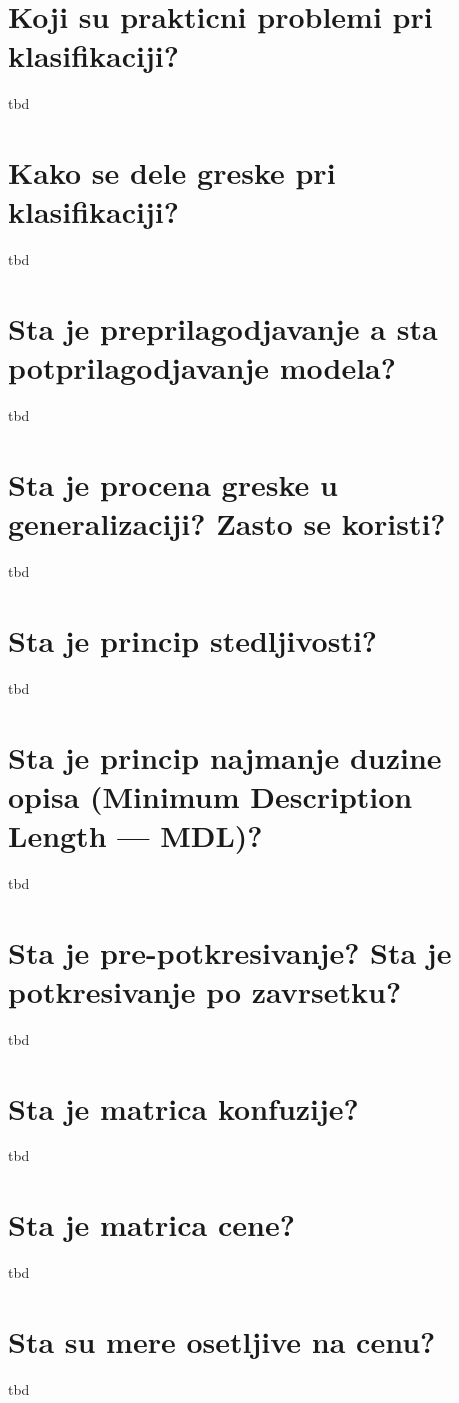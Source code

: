 \documentclass[a4paper]{article}
\begin{document}
\section{Koji su prakticni problemi pri klasifikaciji?}
tbd
\section{Kako se dele greske pri klasifikaciji?}
tbd
\section{Sta je preprilagodjavanje a sta potprilagodjavanje modela?}
tbd
\section{Sta je procena greske u generalizaciji? Zasto se koristi?}
tbd
\section{Sta je princip stedljivosti?}
tbd
\section{Sta je princip najmanje duzine opisa (Minimum Description Length --- MDL)?}
tbd
\section{Sta je pre-potkresivanje? Sta je potkresivanje po zavrsetku?}
tbd
\section{Sta je matrica konfuzije?}
tbd
\section{Sta je matrica cene?}
tbd
\section{Sta su mere osetljive na cenu?}
tbd
\end{document}
